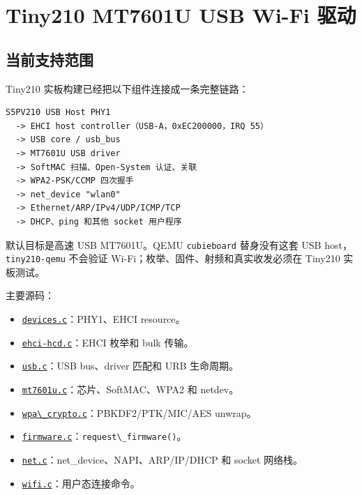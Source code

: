 \chapter{Tiny210 MT7601U USB Wi-Fi
驱动}\label{tiny210-mt7601u-usb-wi-fi-ux9a71ux52a8}

\section{当前支持范围}\label{ux5f53ux524dux652fux6301ux8303ux56f4}

Tiny210 实板构建已经把以下组件连接成一条完整链路：

\begin{lstlisting}
S5PV210 USB Host PHY1
  -> EHCI host controller（USB-A，0xEC200000，IRQ 55）
  -> USB core / usb_bus
  -> MT7601U USB driver
  -> SoftMAC 扫描、Open-System 认证、关联
  -> WPA2-PSK/CCMP 四次握手
  -> net_device "wlan0"
  -> Ethernet/ARP/IPv4/UDP/ICMP/TCP
  -> DHCP、ping 和其他 socket 用户程序
\end{lstlisting}

默认目标是高速 USB MT7601U。QEMU \passthrough{\lstinline!cubieboard!}
替身没有这套 USB host， \passthrough{\lstinline!tiny210-qemu!} 不会验证
Wi-Fi；枚举、固件、射频和真实收发必须在 Tiny210 实板测试。

主要源码：

\begin{itemize}
\tightlist
\item
  \href{../../../kernel/arch/arm/mach-s5pv210/devices.c}{\passthrough{\lstinline!devices.c!}}：PHY1、EHCI
  resource。
\item
  \href{../../../kernel/drivers/usb/host/ehci-hcd.c}{\passthrough{\lstinline!ehci-hcd.c!}}：EHCI
  枚举和 bulk 传输。
\item
  \href{../../../kernel/drivers/usb/core/usb.c}{\passthrough{\lstinline!usb.c!}}：USB
  bus、driver 匹配和 URB 生命周期。
\item
  \href{../../../kernel/drivers/net/wireless/mt7601u.c}{\passthrough{\lstinline!mt7601u.c!}}：芯片、SoftMAC、WPA2
  和 netdev。
\item
  \href{../../../kernel/drivers/net/wireless/wpa_crypto.c}{\passthrough{\lstinline!wpa\_crypto.c!}}：PBKDF2/PTK/MIC/AES
  unwrap。
\item
  \href{../../../kernel/drivers/base/firmware.c}{\passthrough{\lstinline!firmware.c!}}：\passthrough{\lstinline!request\_firmware()!}。
\item
  \href{../../../kernel/net.c}{\passthrough{\lstinline!net.c!}}：net\_device、NAPI、ARP/IP/DHCP
  和 socket 网络栈。
\item
  \href{../../../user/wifi.c}{\passthrough{\lstinline!wifi.c!}}：用户态连接命令。
\end{itemize}

